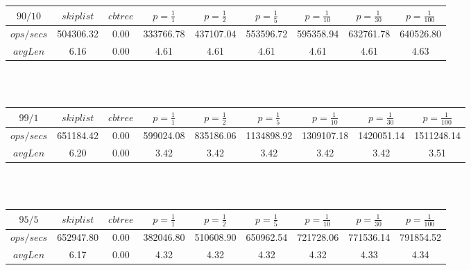 \begin{tabular}{|c|c|c|c|c|c|c|c|c|}
$90/10$ & $skiplist$ & $cbtree$ & $p=\frac{1}{1}$ & $p=\frac{1}{2}$ & $p=\frac{1}{5}$ & $p=\frac{1}{10}$ & $p=\frac{1}{30}$ & $p=\frac{1}{100}$\\\hline
$ops/secs$ & 504306.32 & 0.00 & 333766.78 & 437107.04 & 553596.72 & 595358.94 & 632761.78 & 640526.80\\\hline
$avgLen$ & 6.16 & 0.00 & 4.61 & 4.61 & 4.61 & 4.61 & 4.61 & 4.63\\\hline
\end{tabular}
\\\\
\begin{tabular}{|c|c|c|c|c|c|c|c|c|}
$99/1$ & $skiplist$ & $cbtree$ & $p=\frac{1}{1}$ & $p=\frac{1}{2}$ & $p=\frac{1}{5}$ & $p=\frac{1}{10}$ & $p=\frac{1}{30}$ & $p=\frac{1}{100}$\\\hline
$ops/secs$ & 651184.42 & 0.00 & 599024.08 & 835186.06 & 1134898.92 & 1309107.18 & 1420051.14 & 1511248.14\\\hline
$avgLen$ & 6.20 & 0.00 & 3.42 & 3.42 & 3.42 & 3.42 & 3.42 & 3.51\\\hline
\end{tabular}
\\\\
\begin{tabular}{|c|c|c|c|c|c|c|c|c|}
$95/5$ & $skiplist$ & $cbtree$ & $p=\frac{1}{1}$ & $p=\frac{1}{2}$ & $p=\frac{1}{5}$ & $p=\frac{1}{10}$ & $p=\frac{1}{30}$ & $p=\frac{1}{100}$\\\hline
$ops/secs$ & 652947.80 & 0.00 & 382046.80 & 510608.90 & 650962.54 & 721728.06 & 771536.14 & 791854.52\\\hline
$avgLen$ & 6.17 & 0.00 & 4.32 & 4.32 & 4.32 & 4.32 & 4.33 & 4.34\\\hline
\end{tabular}
\\\\
